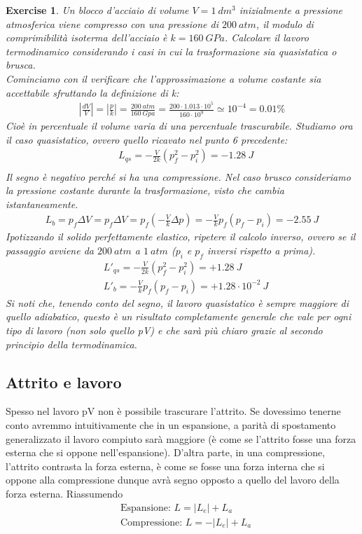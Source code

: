 \documentclass[10pt,a4paper]{article}
\newtheorem{exercise}{Exercise}
\begin{document}
\begin{exercise}
	Un blocco d'acciaio di volume $V = 1\ dm^3$ inizialmente a pressione atmosferica viene compresso con una pressione di $200\ atm$, il modulo di comprimibilità isoterma dell'acciaio è $k = 160\ GPa$. Calcolare il lavoro termodinamico considerando i casi in cui la trasformazione sia quasistatica o brusca.\\
	Cominciamo con il verificare che l'approssimazione a volume costante sia accettabile sfruttando la definizione di k:
	\begin{align*} 
		|\frac{dV}{V}|=|\frac{p}{k}|=\frac{200\ atm}{160\ Gpa}=\frac{200\cdot 1.013\cdot 10^5}{160\cdot 10^9} \simeq 10^{-4} = 0.01 \%
	\end{align*} 
	Cioè in percentuale il volume varia di una percentuale trascurabile. Studiamo ora il caso quasistatico, ovvero quello ricavato nel punto 6 precedente:
	\begin{align*} 
		&L_{qs} = -\frac{V}{2k}\left(p_f^2-p_i^2\right) = -1.28\ J\\	
	\end{align*} 
	Il segno è negativo perché si ha una compressione. Nel caso brusco consideriamo la pressione costante durante la trasformazione, visto che cambia istantaneamente.
	\begin{align*} 
	L_b = p_f\Delta V = p_f\Delta V = p_f\left(-\frac{V}{k}\Delta p \right)=-\frac{V}{k} p_f(p_f - p_i) = -2.55\ J
	\end{align*} 
	Ipotizzando il solido perfettamente elastico, ripetere il calcolo inverso, ovvero se il passaggio avviene da $200\ atm$ a $1\ atm$ ($p_i$ e $p_f$ inversi rispetto a prima).
	\begin{align*} 
		&L'_{qs} = -\frac{V}{2k}\left(p_f^2-p_i^2\right) = +1.28\ J\\
		&L'_b = -\frac{V}{k} p_f(p_f - p_i) = +1.28 \cdot 10^{-2}\ J
	\end{align*} 
	Si noti che, tenendo conto del segno, il lavoro quasistatico è sempre maggiore di quello adiabatico, questo è un risultato completamente generale che vale per ogni tipo di lavoro (non solo quello pV) e che sarà più chiaro grazie al secondo principio della termodinamica.
\end{exercise}
\subsection{Attrito e lavoro}
Spesso nel lavoro pV non è possibile trascurare l'attrito. Se dovessimo tenerne conto avremmo intuitivamente che in un espansione, a parità di spostamento generalizzato il lavoro compiuto sarà maggiore (è come se l'attrito fosse una forza esterna che si oppone nell'espansione). D'altra parte, in una compressione, l'attrito contrasta la forza esterna, è come se fosse una forza interna che si oppone alla compressione dunque avrà segno opposto a quello del lavoro della forza esterna. Riassumendo
\begin{align*} 
	&\text{Espansione: } L = |L_e| + L_a\\
	&\text{Compressione: } L = -|L_e| +L_a
\end{align*} 
\end{document}

